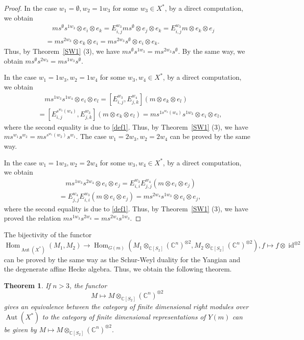 \documentclass{article}
\newtheorem{Theorem}[equation]{Theorem}
\theoremstyle{definition}
\theoremstyle{remark}
\numberwithin{equation}{section}
\DeclareMathOperator{\Hom}{Hom}
\DeclareMathOperator{\id}{id}
\DeclareMathOperator{\Aut}{Aut}
\numberwithin{equation}{section}
\begin{document}
\begin{proof}
In the case $w_1=\emptyset,w_2=1w_3$ for some $w_3\in X^*$, by a direct computation, we obtain
\begin{align*}
&\quad ms^\emptyset s^{1w_3}\otimes e_i\otimes e_k=E^{w_3}_{i,j}ms^\emptyset\otimes e_j\otimes e_k=E^{w_3}_{i,j}m\otimes e_k\otimes e_j\\
&=ms^{2w_3}\otimes e_k\otimes e_i=ms^{2w_3}s^\emptyset \otimes e_i\otimes e_k.
\end{align*}
Thus, by Theorem~\ref{SW1} (3), we have $ms^\emptyset s^{1w_3}=m s^{2w_3}s^\emptyset$. By the same way, we obtain  
$ms^\emptyset s^{2w_3}=m s^{1w_3}s^\emptyset$.

In the case $w_1=1w_3,w_2=1w_4$ for some $w_3,w_4\in X^*$, by a direct computation, we obtain
\begin{align*}
&\quad ms^{1w_3}s^{1w_4}\otimes e_{i}\otimes e_{l}=[E^{w_3}_{i,j},E^{w_4}_{j,k}](m\otimes e_{k}\otimes e_{l})\\
&=[E^{s^{w_3}(w_4)}_{i,j},E^{w_3}_{j,k}](m\otimes e_{k}\otimes e_{l})=ms^{1s^{w_3}(w_4)}s^{1w_3}\otimes e_{i}\otimes e_{l},
\end{align*}
where the second equality is due to \eqref{def1}.
Thus, by Theorem~\ref{SW1} (3), we have $ms^{w_1}s^{w_2}=ms^{s^{w_1}(w_2)}s^{w_1}$. The case $w_1=2w_3,w_2=2w_4$ can be proved by the same way.

In the case $w_1=1w_3,w_2=2w_4$ for some $w_3,w_4\in X^*$, by a direct computation, we obtain
\begin{align*}
&\quad ms^{1w_3}s^{2w_4}\otimes e_{i}\otimes e_{j}=E^{w_3}_{i,i}E^{w_4}_{j,j}(m\otimes e_{i}\otimes e_{j})\\
&=E^{w_4}_{j,j}E^{w_3}_{i,i}(m\otimes e_{i}\otimes e_{j})=ms^{2w_4}s^{1w_3}\otimes e_{i}\otimes e_{j},
\end{align*}
where the second equality is due to \eqref{def1}. Thus, by Theorem~\ref{SW1} (3), we have proved the relation $ms^{1w_3}s^{2w_4}=ms^{2w_4}s^{1w_3}$. 
\end{proof}
The bijectivity of the functor 
\[\Hom_{\Aut(X^*)}(M_1,M_2)\to \Hom_{G(m)}(M_1\otimes_{\mathbb{C}[S_2]}(\mathbb{C}^n)^{\otimes2},M_2\otimes_{\mathbb{C}[S_2]}(\mathbb{C}^n)^{\otimes2}),f\mapsto f\otimes\id^{\otimes2}\]
can be proved by the same way as the Schur-Weyl duality for the Yangian and the degenerate affine Hecke algebra. Thus, we obtain the following theorem.
\begin{Theorem}
If $n>3$, the functor 
\[
M\mapsto M\otimes_{\mathbb{C}[S_2]}(\mathbb{C}^n)^{\otimes 2}
\]
gives an equivalence between the category of finite dimensional right modules over $\Aut(X^*)$ to the category of finite dimensional representations of $Y(m)$ can be given by $M\mapsto M\otimes_{\mathbb{C}[S_2]}(\mathbb{C}^n)^{\otimes 2}$. 
\end{Theorem}
\end{document}
